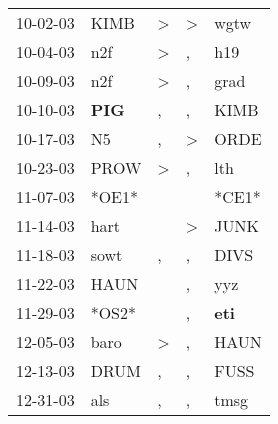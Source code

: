 \begin{supertabular}{p{0.07\textwidth}p{0.06\textwidth}p{0.02\textwidth}p{0.02\textwidth}p{0.06\textwidth}}
          10-02-03\textsuperscript{} &           KIMB\textsuperscript{} &     \textgreater &     \textgreater &           wgtw\textsuperscript{} \\
          10-04-03\textsuperscript{} &            n2f\textsuperscript{} &     \textgreater &                , &            h19\textsuperscript{} \\
          10-09-03\textsuperscript{} &            n2f\textsuperscript{} &     \textgreater &                , &           grad\textsuperscript{} \\
          10-10-03\textsuperscript{} &   \textbf{PIG\textsuperscript{}} &                , &                , &           KIMB\textsuperscript{} \\
          10-17-03\textsuperscript{} &             N5\textsuperscript{} &                , &     \textgreater &           ORDE\textsuperscript{} \\
          10-23-03\textsuperscript{} &           PROW\textsuperscript{} &     \textgreater &                , &            lth\textsuperscript{} \\
          11-07-03\textsuperscript{} &                            *OE1* &                  &                  &                            *CE1* \\
          11-14-03\textsuperscript{} &           hart\textsuperscript{} &                  &     \textgreater &           JUNK\textsuperscript{} \\
          11-18-03\textsuperscript{} &           sowt\textsuperscript{} &                , &                , &           DIVS\textsuperscript{} \\
          11-22-03\textsuperscript{} &           HAUN\textsuperscript{} &                  &                , &            yyz\textsuperscript{} \\
          11-29-03\textsuperscript{} &                            *OS2* &                  &                , &   \textbf{eti\textsuperscript{}} \\
          12-05-03\textsuperscript{} &           baro\textsuperscript{} &     \textgreater &                , &           HAUN\textsuperscript{} \\
          12-13-03\textsuperscript{} &           DRUM\textsuperscript{} &                , &                , &           FUSS\textsuperscript{} \\
          12-31-03\textsuperscript{} &            als\textsuperscript{} &                , &                , &           tmsg\textsuperscript{} \\

\end{supertabular}
